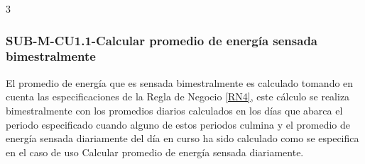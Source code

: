 3\subsubsection{SUB-M-CU1.1-Calcular promedio de energía sensada bimestralmente}\label{SUB-M-CU1.1}
El promedio de energía que es sensada bimestralmente es calculado tomando en cuenta las especificaciones de la Regla de Negocio \ref{RN4}, este cálculo se realiza bimestralmente con los promedios diarios calculados en los días que abarca el periodo especificado cuando alguno de estos periodos  culmina y el promedio de energía sensada diariamente del día en curso ha sido calculado como se especifica en el caso de uso Calcular promedio de energía sensada diariamente.
